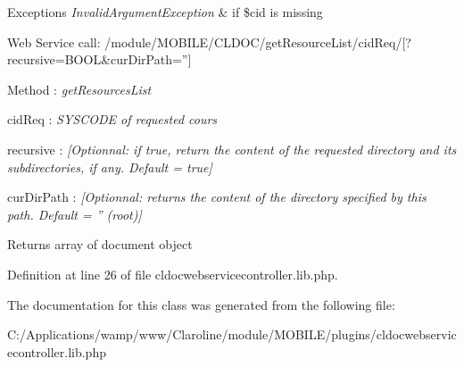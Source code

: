 \begin{DoxyExceptions}{Exceptions}
{\em InvalidArgumentException} & if \$cid is missing \\
\hline
\end{DoxyExceptions}
\begin{DoxyParagraph}{Web Service call: /module/MOBILE/CLDOC/getResourceList/cidReq/\mbox{[}?recursive=BOOL\&curDirPath=''\mbox{]}}

\end{DoxyParagraph}

\begin{DoxyPre}        Method : {\itshape getResourcesList\/}\end{DoxyPre}



\begin{DoxyPre}        cidReq : {\itshape SYSCODE of requested cours\/}\end{DoxyPre}



\begin{DoxyPre}        recursive : {\itshape [Optionnal: if true, return the content of the requested directory and its subdirectories, if any. Default = true]\/}\end{DoxyPre}



\begin{DoxyPre}        curDirPath : {\itshape [Optionnal: returns the content of the directory specified by this path. Default = '' (root)]\/}\end{DoxyPre}


\begin{DoxyReturn}{Returns}
array of document object 
\end{DoxyReturn}


Definition at line 26 of file cldocwebservicecontroller.lib.php.



The documentation for this class was generated from the following file:\begin{DoxyCompactItemize}
\item 
C:/Applications/wamp/www/Claroline/module/MOBILE/plugins/cldocwebservicecontroller.lib.php\end{DoxyCompactItemize}
